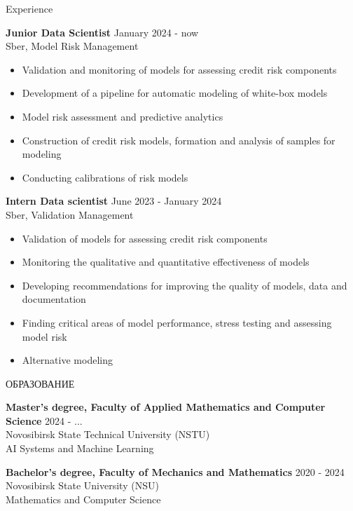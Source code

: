 \documentclass{resume} %
\begin{document}
\begin{rSection}{Experience}

\textbf{Junior Data Scientist} \hfill January 2024 - now \\
Sber, Model Risk Management %
 \begin{itemize}
    \itemsep -3pt {} 
\item Validation and monitoring of models for assessing credit risk components
\item Development of a pipeline for automatic modeling of white-box models
\item Model risk assessment and predictive analytics
\item Construction of credit risk models, formation and analysis of samples for modeling
\item Conducting calibrations of risk models
 \end{itemize}
 
\textbf{Intern Data scientist} \hfill June 2023 - January 2024\\
Sber, Validation Management %
 \begin{itemize}
    \itemsep -3pt {}
\item Validation of models for assessing credit risk components
\item Monitoring the qualitative and quantitative effectiveness of models
\item Developing recommendations for improving the quality of models, data and documentation
\item Finding critical areas of model performance, stress testing and assessing model risk
\item Alternative modeling
 \end{itemize}

\end{rSection} 
\begin{rSection}{ОБРАЗОВАНИЕ}

{\bf Master's degree, Faculty of Applied Mathematics and Computer Science} \hfill {2024 - ...} \\
Novosibirsk State Technical University (NSTU) \\
AI Systems and Machine Learning

{\bf Bachelor's degree, Faculty of Mechanics and Mathematics} \hfill {2020 - 2024} \\
Novosibirsk State University (NSU) \\
Mathematics and Computer Science

\end{rSection}

\begin{rSection}
{} 
\end{rSection}
\end{document}
